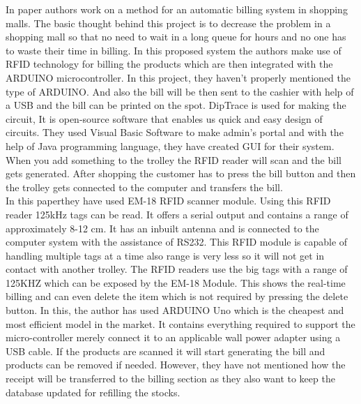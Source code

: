 \documentclass[conference]{IEEEtran}
\begin{document}
In paper\cite{b10} authors work on a method for an automatic billing system in shopping malls. The basic thought behind this project is to decrease the problem in a shopping mall so that no need to wait in a long queue for hours and no one has to waste their time in billing. In this proposed system the authors make use of RFID technology for billing the products which are then integrated with the ARDUINO microcontroller. In this project, they haven't properly mentioned the type of ARDUINO. And also the bill will be then sent to the cashier with help of a USB and the bill can be printed on the spot. DipTrace is used for making the circuit, It is open-source software that enables us quick and easy design of circuits. They used Visual Basic Software to make admin's portal and with the help of Java programming language, they have created GUI for their system. When you add something to the trolley the RFID reader will scan and the bill gets generated. After shopping the customer has to press the bill button and then the trolley gets connected to the computer and transfers the bill.\\ 

In this paper\cite{b11}they have used EM-18 RFID scanner module. Using this RFID reader 125kHz tags can be read. It offers a serial output and contains a range of approximately 8-12 cm. It has an inbuilt antenna and is connected to the computer system with the assistance of RS232. This RFID module is capable of handling multiple tags at a time also range is very less so it will not get in contact with another trolley. The RFID readers use the big tags with a range of 125KHZ which can be exposed by the EM-18 Module. This shows the real-time billing and can even delete the item which is not required by pressing the delete button. In this, the author has used ARDUINO Uno which is the cheapest and most efficient model in the market. It contains everything required to support the micro-controller merely connect it to an applicable wall power adapter using a USB cable. If the products are scanned it will start generating the bill and products can be removed if needed. However, they have not mentioned how the receipt will be transferred to the billing section as they also want to keep the database updated for refilling the stocks.\\
\end{document}
